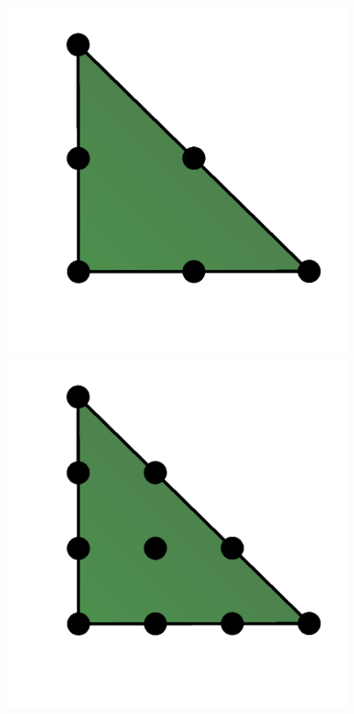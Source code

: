 \begin{figure}
  \includegraphics[width=\fourfigs]{chapters/kirby-6/png/DG2_2d.png}
  \includegraphics[width=\fourfigs]{chapters/kirby-6/png/DG3_2d.png} \\

\end{figure}
